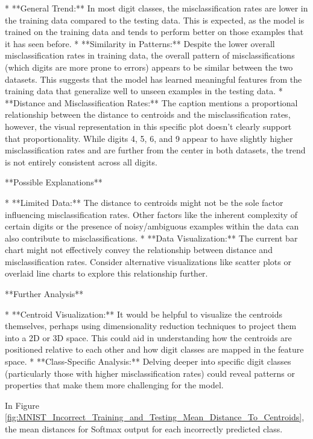 * **General Trend:** In most digit classes, the misclassification rates are lower in the training data compared to the testing data. This is expected, as the model is trained on the training data and tends to perform better on those examples that it has seen before.
* **Similarity in Patterns:**  Despite the lower overall misclassification rates in training data, the overall pattern of misclassifications (which digits are more prone to errors) appears to be similar between the two datasets. This suggests that the model has learned meaningful features from the training data that generalize well to unseen examples in the testing data.
* **Distance and Misclassification Rates:** The caption mentions a proportional relationship between the distance to centroids and the misclassification rates, however, the visual representation in this specific plot doesn't clearly support that proportionality. While digits 4, 5, 6, and 9 appear to have slightly higher misclassification rates and are further from the center in both datasets, the trend is not entirely consistent across all digits. 

**Possible Explanations**

* **Limited Data:** The distance to centroids might not be the sole factor influencing misclassification rates. Other factors like the inherent complexity of certain digits or the presence of noisy/ambiguous examples within the data can also contribute to misclassifications.
* **Data Visualization:**  The current bar chart might not effectively convey the relationship between distance and misclassification rates. Consider alternative visualizations like scatter plots or overlaid line charts to explore this relationship further.

**Further Analysis**

* **Centroid Visualization:** It would be helpful to visualize the centroids themselves, perhaps using dimensionality reduction techniques to project them into a 2D or 3D space. This could aid in understanding how the centroids are positioned relative to each other and how digit classes are mapped in the feature space. 
* **Class-Specific Analysis:**  Delving deeper into specific digit classes (particularly those with higher misclassification rates) could reveal patterns or properties that make them more challenging for the model.

In Figure \ref{fig:MNIST_Incorrect_Training_and_Testing_Mean_Distance_To_Centroids}, the mean distances for Softmax output for each incorrectly predicted class.

